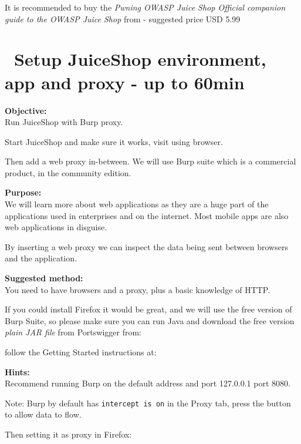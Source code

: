 \documentclass[a4paper,11pt,notitlepage]{report}
\begin{document}
It is recommended to buy the \emph{Pwning OWASP Juice Shop Official companion guide to the OWASP Juice Shop} from  - suggested price USD 5.99



\chapter{\faExclamationTriangle\ Setup JuiceShop environment, app and proxy - up to 60min}
\label{ex:js-burp}

{\bf Objective:}\\
Run JuiceShop with Burp proxy.

Start JuiceShop and make sure it works, visit using browser.

Then add a web proxy in-between. We will use Burp suite which is a commercial product, in the community edition.

{\bf Purpose:}\\
We will learn more about web applications as they are a huge part of the applications used in enterprises and on the internet. Most mobile apps are also web applications in disguise.

By inserting a web proxy we can inspect the data being sent between browsers and the application.

{\bf Suggested method:}\\
You need to have browsers and a proxy, plus a basic knowledge of HTTP.

If you could install Firefox it would be great, and we will use the
free version of Burp Suite, so please make sure you can run Java and
download the free version \emph{plain JAR file} from Portswigger from:


follow the Getting Started instructions at:\\


{\bf Hints:}\\
Recommend running Burp on the default address and port 127.0.0.1 port 8080.

Note: Burp by default has \verb+intercept is on+ in the Proxy tab, press the button to allow data to flow.


Then setting it as proxy in Firefox:
\end{document}
